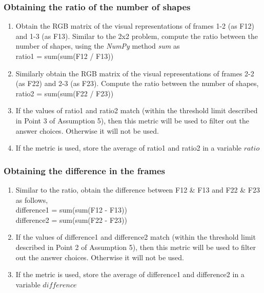 \documentclass[10pt, letter]{article}
\begin{document}
\subsubsection*{Obtaining the ratio of the number of shapes}
\begin{enumerate}
	\item Obtain the RGB matrix of the visual representations of frames 1-2 (as F12) and 1-3 (as F13). Similar to the 2x2 problem, compute the ratio between the number of shapes, using the \textit{NumPy} method \textit{sum} as \\
	\hspace*{3cm} ratio1 = sum(sum(F12 / F13))
	\item Similarly obtain the RGB matrix of the visual representations of frames 2-2 (as F22) and 2-3 (as F23). Compute the ratio between the number of shapes,\\
	\hspace*{3cm} ratio2 = sum(sum(F22 / F23))
	\item If the values of ratio1 and ratio2 match (within the threshold limit described in Point 3 of Assumption 5), then this metric will be used to filter out the answer choices. Otherwise it will not be used.
	\item If the metric is used, store the average of ratio1 and ratio2 in a variable $ratio$
\end{enumerate}

\subsubsection*{Obtaining the difference in the frames}
\begin{enumerate}
	\item Similar to the ratio, obtain the difference between F12 \& F13 and F22 \& F23 as follows, \\
	\hspace*{3cm} difference1 = sum(sum(F12 - F13))\\
	\hspace*{3cm} difference2 = sum(sum(F22 - F23))
	\item If the values of difference1 and difference2 match (within the threshold limit described in Point 2 of Assumption 5), then this metric will be used to filter out the answer choices. Otherwise it will not be used.
	\item If the metric is used, store the average of difference1 and difference2 in a variable $difference$
\end{enumerate}
\end{document}
